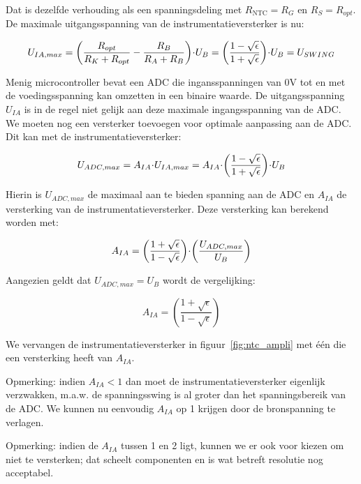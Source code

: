 \documentclass[12pt,a4paper,final,twoside,fleqn]{article}
\newcommand{\rntc}{R_\text{NTC}}
\newcommand{\ropt}{R_{opt}}
\let\oldcdot\cdot
\renewcommand{\cdot}{\kern-.10em\oldcdot\kern-.10em}
\begin{document}
Dat is dezelfde verhouding als een spanningsdeling met $\rntc = R_G$ en
$R_S = \ropt$.
De maximale uitgangsspanning van de instrumentatieversterker is nu:

\begin{equation}
U_{IA,max} = \left( \dfrac{\ropt}{R_K+\ropt} - \dfrac{R_B}{R_A+R_B}\right)\cdot U_B =
\left(\dfrac{1-\sqrt{\epsilon}}{1+\sqrt{\epsilon}}\right)\cdot U_B = U_{SWING}
\end{equation}

Menig microcontroller bevat een ADC die ingansspanningen van 0V tot en met de
voedingsspanning kan omzetten in een binaire waarde. De uitgangsspanning $U_{IA}$
is in de regel niet gelijk aan deze maximale ingangsspanning van de ADC. We moeten
nog een versterker toevoegen voor optimale aanpassing aan de ADC. Dit kan met
de instrumentatieversterker:

\begin{equation}
U_{ADC,max} = A_{IA}\cdot U_{IA,max} = A_{IA}\cdot \left(\dfrac{1-\sqrt{\epsilon}}{1+\sqrt{\epsilon}}\right)\cdot U_B
\end{equation}

Hierin is $U_{ADC,max}$ de maximaal aan te bieden spanning aan de ADC en $A_{IA}$ de
versterking van de instrumentatieversterker. Deze versterking
kan berekend worden met:

\begin{equation}
A_{IA} = \left(\dfrac{1+\sqrt{\epsilon}}{1-\sqrt{\epsilon}}\right)\cdot
\left( \dfrac{U_{ADC,max}}{U_B}\right)
\end{equation}

Aangezien geldt dat $U_{ADC,max} = U_B$ wordt de vergelijking:

\begin{equation}
A_{IA} = \left(\dfrac{1+\sqrt{\epsilon}}{1-\sqrt{\epsilon}}\right)%
\end{equation}


We vervangen de instrumentatieversterker in figuur~\ref{fig:ntc_ampli} met
\'e\'en die een versterking heeft van $A_{IA}$.

Opmerking: indien $A_{IA} < 1$ dan moet de instrumentatieversterker eigenlijk
verzwakken, m.a.w. de spanningsswing is al groter dan het spanningsbereik van
de ADC. We kunnen nu eenvoudig $A_{IA}$ op 1 krijgen door de bronspanning te
verlagen.

Opmerking: indien de $A_{IA}$ tussen 1 en 2 ligt, kunnen we er ook voor kiezen
om niet te versterken; dat scheelt componenten en is wat betreft resolutie nog
acceptabel.
\end{document}
